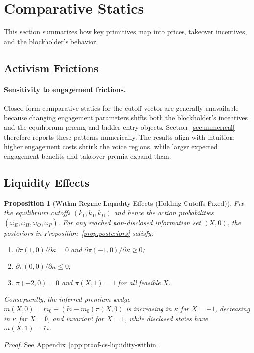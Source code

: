 \documentclass[11pt]{article}
\newtheorem{proposition}{Proposition}
\newcommand{\1}{\mathbf{1}}
\begin{document}
\section{Comparative Statics}
\label{sec:comp-statics}

This section summarizes how key primitives map into prices, takeover incentives, and the blockholder's behavior.

\subsection{Activism Frictions}

\paragraph{Sensitivity to engagement frictions.}
Closed-form comparative statics for the cutoff vector are generally unavailable because changing engagement parameters shifts both the blockholder's incentives and the equilibrium pricing and bidder-entry objects. Section~\ref{sec:numerical} therefore reports these patterns numerically. The results align with intuition: higher engagement costs shrink the voice regions, while larger expected engagement benefits and takeover premia expand them.

\subsection{Liquidity Effects}

\begin{proposition}[Within-Regime Liquidity Effects (Holding Cutoffs Fixed)]
\label{prop:cs-liquidity-within}
Fix the equilibrium cutoffs $(k_1,k_0,k_D)$ and hence the action probabilities $(\omega_E,\omega_H,\omega_Q,\omega_P)$. For any reached non-disclosed information set $(X,0)$, the posteriors in Proposition~\ref{prop:posteriors} satisfy:
\begin{enumerate}[label=\textup{(\alph*)},leftmargin=2em]
\item $\partial \pi(1,0)/\partial \kappa = 0$ and $\partial \pi(-1,0)/\partial \kappa \ge 0$;
\item $\partial \pi(0,0)/\partial \kappa \le 0$;
\item $\pi(-2,0)=0$ and $\pi(X,1)=1$ for all feasible $X$.
\end{enumerate}
Consequently, the inferred premium wedge $m(X,0)=m_0+(\tilde{m}-m_0)\pi(X,0)$ is increasing in $\kappa$ for $X=-1$, decreasing in $\kappa$ for $X=0$, and invariant for $X=1$, while disclosed states have $m(X,1)=\tilde{m}$.
\end{proposition}
\textit{Proof.} See Appendix~\ref{app:proof-cs-liquidity-within}.
\end{document}
